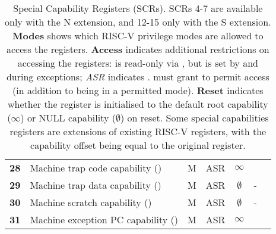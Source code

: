 \begin{table}[h!]
\begin{tabular}{cllcccc@{}}
\textbf{28} & Machine trap code capability (\MTCC{})     & M & ASR & $\infty$    & \mtvec{} \\
\textbf{29} & Machine trap data capability (\MTDC{})     & M & ASR & $\emptyset$ & -        \\
\textbf{30} & Machine scratch capability (\MScratchC{})  & M & ASR & $\emptyset$ & -        \\
\textbf{31} & Machine exception PC capability (\MEPCC{}) & M & ASR & $\infty$    & \mepc{}  \\
\bottomrule
\end{tabular}
\caption{Special Capability Registers (SCRs).
SCRs 4-7 are available only with the N extension, and 12-15 only with the S
extension.
\textbf{Modes} shows which RISC-V privilege modes are allowed to access the
registers.
\textbf{Access} indicates additional restrictions on accessing the registers:
\PCC{} is read-only via , but is set by
 and during exceptions; \textit{ASR} indicates
\PCC{}.\cperms{} must grant \cappermASR{} to permit access (in addition to
being in a permitted mode).
\textbf{Reset} indicates whether the register is initialised to the default
root capability ($\infty$) or NULL capability ($\emptyset$) on reset.
Some special capabilities registers are extensions of existing RISC-V
registers, with the capability offset being equal to the original register.
}
\label{tab:risc-v-special-capability-registers}
\end{table}

